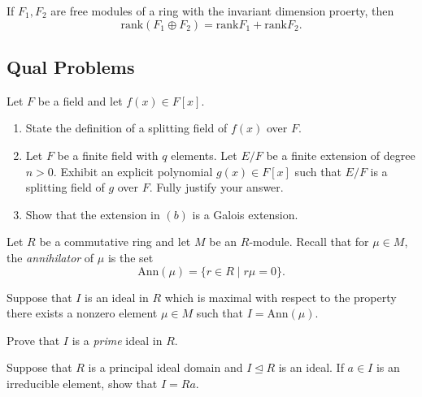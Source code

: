 \begin{problem}[Hungerford 4.2.9]
If $F_1, F_2$ are free modules of a ring with the invariant dimension proerty, then 
\[
\mathrm{rank}(F_1 \oplus F_2) = \mathrm{rank} F_1 + \mathrm{rank} F_2.
\]
\end{problem}

\newpage
\subsection{Qual Problems}

\begin{problem}
Let $F$ be a field and let $f(x) \in F[x]$.
\begin{enumerate}
    \item State the definition of a splitting field of $f(x)$ over $F$.
    
    \item Let $F$ be a finite field with $q$ elements. Let $E/F$ be a finite extension of degree $n>0$. Exhibit an explicit polynomial $g(x) \in F[x]$ such that $E/F$ is a splitting field of $g$ over $F$. Fully justify your answer.
    
    \item Show that the extension in $(b)$ is a Galois extension.
\end{enumerate}
\end{problem}

\begin{problem}
Let $R$ be a commutative ring and let $M$ be an $R$-module. Recall that for $\mu \in M$, the \textit{annihilator} of $\mu$ is the set 
\[
\mathrm{Ann}(\mu) = \{ r\in R \mid r\mu = 0\}.
\]

Suppose that $I$ is an ideal in $R$ which is maximal with respect to the property there exists a nonzero element $\mu \in M$ such that $I = \mathrm{Ann}(\mu)$.

Prove that $I$ is a \textit{prime} ideal in $R$.

\end{problem}

\begin{problem}
Suppose that $R$ is a principal ideal domain and $I \trianglelefteq R$ is an ideal. If $a\in I$ is an irreducible element, show that $I = Ra$.
\end{problem}
